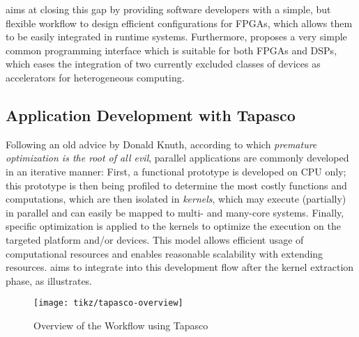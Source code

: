 \medskip
\tapasco{} aims at closing this gap by providing software developers with a simple, but flexible workflow to design efficient configurations for FPGAs, which allows them to be easily integrated in runtime systems.
Furthermore, \tapasco{} proposes a very simple common programming interface which is suitable for both FPGAs and DSPs, which eases the integration of two currently excluded classes of devices as accelerators for heterogeneous computing.

\subsection*{Application Development with Tapasco}
Following an old advice by Donald Knuth, according to which \emph{premature optimization is the root of all evil}, parallel applications are commonly developed in an iterative manner:
First, a functional prototype is developed on CPU only; this prototype is then being profiled to determine the most costly functions and computations, which are then isolated in \emph{kernels}, which may execute (partially) in parallel and can easily be mapped to multi- and many-core systems.
Finally, specific optimization is applied to the kernels to optimize the execution on the targeted platform and/or devices.
This model allows efficient usage of computational resources and enables reasonable scalability with extending resources.
\tapasco{} aims to integrate into this development flow after the kernel extraction phase, as  illustrates.
%
\begin{figure}%
  \centering\texttt{[image: tikz/tapasco-overview]}
  \caption{Overview of the Workflow using Tapasco}
  \label{fig:tapasco-overview}
\end{figure}
%

